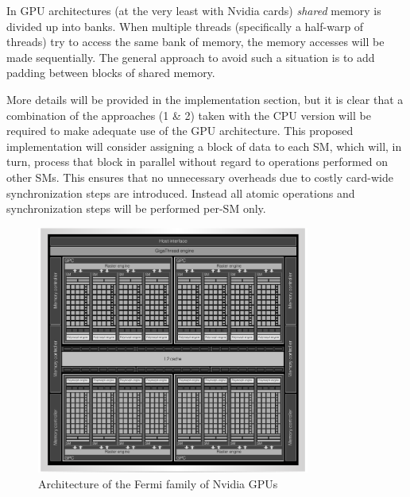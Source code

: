 In GPU architectures (at the very least with Nvidia cards) \emph{shared} memory is divided up into banks. When multiple threads (specifically a half-warp of threads) try to 
access the same bank of memory, the memory accesses will be made sequentially. The general approach to avoid such a situation is to add padding between blocks of shared memory.

More details will be provided in the implementation section, but it is clear that a combination of the approaches (1 \& 2) taken with the CPU version will be required to make 
adequate use of the GPU architecture. This proposed implementation will consider assigning a block of data to each SM, which will, in turn, process that block in parallel without 
regard to operations performed on other SMs. This ensures that no unnecessary overheads due to costly card-wide synchronization steps are introduced. Instead all atomic 
operations and synchronization steps will be performed per-SM only.
\begin{figure}[h!]
\begin{mdframed}
 \centering
 \includegraphics[width=0.8\textwidth]{fermi_arch.png}
 \caption{Architecture of the Fermi family of Nvidia GPUs \cite{wittenbrink2011fermi}}
 \label{FERMI_ARCH}
\end{mdframed}
\end{figure}
